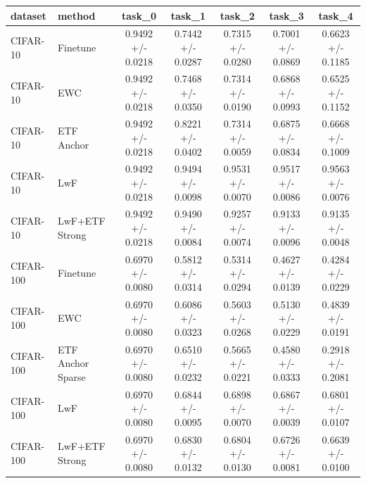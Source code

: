 \begin{tabular}{llccccc}
\hline
dataset & method & task\_0 & task\_1 & task\_2 & task\_3 & task\_4 \\
\hline
CIFAR-10 & Finetune & 0.9492 +/- 0.0218 & 0.7442 +/- 0.0287 & 0.7315 +/- 0.0280 & 0.7001 +/- 0.0869 & 0.6623 +/- 0.1185 \\
CIFAR-10 & EWC & 0.9492 +/- 0.0218 & 0.7468 +/- 0.0350 & 0.7314 +/- 0.0190 & 0.6868 +/- 0.0993 & 0.6525 +/- 0.1152 \\
CIFAR-10 & ETF Anchor & 0.9492 +/- 0.0218 & 0.8221 +/- 0.0402 & 0.7314 +/- 0.0059 & 0.6875 +/- 0.0834 & 0.6668 +/- 0.1009 \\
CIFAR-10 & LwF & 0.9492 +/- 0.0218 & 0.9494 +/- 0.0098 & 0.9531 +/- 0.0070 & 0.9517 +/- 0.0086 & 0.9563 +/- 0.0076 \\
CIFAR-10 & LwF+ETF Strong & 0.9492 +/- 0.0218 & 0.9490 +/- 0.0084 & 0.9257 +/- 0.0074 & 0.9133 +/- 0.0096 & 0.9135 +/- 0.0048 \\
CIFAR-100 & Finetune & 0.6970 +/- 0.0080 & 0.5812 +/- 0.0314 & 0.5314 +/- 0.0294 & 0.4627 +/- 0.0139 & 0.4284 +/- 0.0229 \\
CIFAR-100 & EWC & 0.6970 +/- 0.0080 & 0.6086 +/- 0.0323 & 0.5603 +/- 0.0268 & 0.5130 +/- 0.0229 & 0.4839 +/- 0.0191 \\
CIFAR-100 & ETF Anchor Sparse & 0.6970 +/- 0.0080 & 0.6510 +/- 0.0232 & 0.5665 +/- 0.0221 & 0.4580 +/- 0.0333 & 0.2918 +/- 0.2081 \\
CIFAR-100 & LwF & 0.6970 +/- 0.0080 & 0.6844 +/- 0.0095 & 0.6898 +/- 0.0070 & 0.6867 +/- 0.0039 & 0.6801 +/- 0.0107 \\
CIFAR-100 & LwF+ETF Strong & 0.6970 +/- 0.0080 & 0.6830 +/- 0.0132 & 0.6804 +/- 0.0130 & 0.6726 +/- 0.0081 & 0.6639 +/- 0.0100 \\
\hline
\end{tabular}
